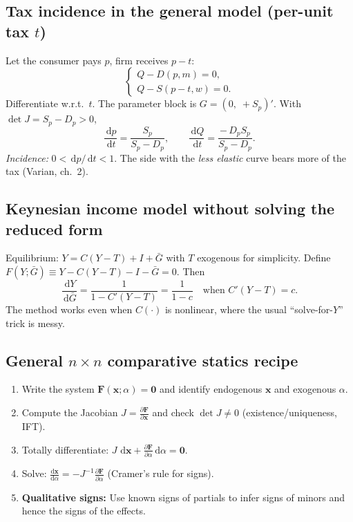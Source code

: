 \documentclass[11pt]{article}
\newcommand{\dd}{\,\mathrm{d}}
\newcommand{\pd}[2]{\frac{\partial #1}{\partial #2}}
\newcommand{\dtotal}[2]{\frac{\mathrm{d} #1}{\mathrm{d} #2}}
\newcommand{\vect}[1]{\bm{#1}}
\begin{document}
\subsection*{Tax incidence in the general model (per-unit tax $t$)}
Let the consumer pays $p$, firm receives $p-t$:
\[
\begin{cases}
Q - D(p,m)=0,\\
Q - S(p-t,w)=0.
\end{cases}
\]
Differentiate w.r.t.\ $t$. The parameter block is $G=(0,\; +S_{p}\!)'$. With $\det J=S_p - D_p>0$,
\[
\frac{\dd p}{\dd t}=\frac{S_p}{S_p - D_p}, \qquad
\frac{\dd Q}{\dd t}=\frac{-\,D_p S_p}{S_p - D_p}.
\]
\emph{Incidence:} $0<\dd p/\dd t<1$. The side with the \emph{less elastic} curve bears more of the tax (Varian, ch.~2).

\subsection*{Keynesian income model without solving the reduced form}
Equilibrium: $Y = C(Y-T)+I+\bar{G}$ with $T$ exogenous for simplicity. Define $F(Y;\bar{G})\equiv Y - C(Y-T) - I - \bar{G}=0$.
Then
\[
\frac{\dd Y}{\dd \bar{G}}=\frac{1}{1 - C'(Y-T)}=\frac{1}{1-c}\quad\text{when } C'(Y-T)=c.
\]
The method works even when $C(\cdot)$ is nonlinear, where the usual ``solve-for-$Y$'' trick is messy.

\subsection*{General $n\times n$ comparative statics recipe}
\begin{enumerate}[label=\arabic*.]
\item Write the system $\vect{F}(\vect{x};\alpha)=\vect{0}$ and identify endogenous $\vect{x}$ and exogenous $\alpha$.
\item Compute the Jacobian $J=\pd{\vect{F}}{\vect{x}}$ and check $\det J\neq 0$ (existence/uniqueness, IFT).
\item Totally differentiate: $J\,\dd \vect{x} + \pd{\vect{F}}{\alpha}\dd \alpha=\vect{0}$.
\item Solve: $\dtotal{\vect{x}}{\alpha}=-J^{-1}\pd{\vect{F}}{\alpha}$ (Cramer's rule for signs).
\item \textbf{Qualitative signs:} Use known signs of partials to infer signs of minors and hence the signs of the effects.
\end{enumerate}
\end{document}
